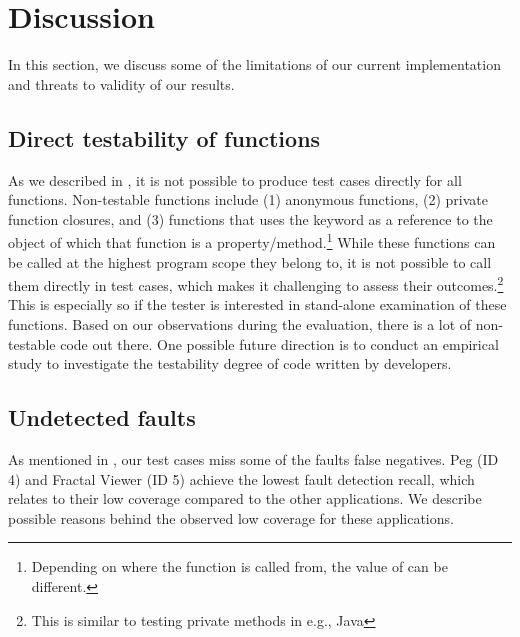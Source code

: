 \section{Discussion} \label{Sec:discussion}
In this section, we discuss some of the limitations of our current implementation and threats to validity of our results.

\subsection{Direct testability of functions} As we described in , it is not possible to produce test cases directly for all \javascript functions.
Non-testable \javascript functions include (1) anonymous functions, (2) private function closures, and (3) functions that uses the  keyword as a reference to the object of which that function is a property/method.\footnote{Depending on where the function is called from, the value of  can be different.}
While these functions can be called at the highest program scope they belong to, it is not possible to call them directly in test cases, which makes it challenging to assess their outcomes.\footnote{This is similar to testing private methods in e.g., Java} This is especially so if the tester is interested in stand-alone examination of these functions.  Based on our observations during the evaluation, there is a lot of non-testable \javascript code out there. One possible future direction is to conduct an empirical study to investigate the testability degree of \javascript code written by developers.
 
\subsection{Undetected faults} As mentioned in , our test cases miss some of the faults \ie false negatives. 
Peg (ID 4) and Fractal Viewer (ID 5) achieve the lowest fault detection recall, which relates to their low coverage compared to the other applications. 
We describe possible reasons behind the observed low coverage for these applications.  


